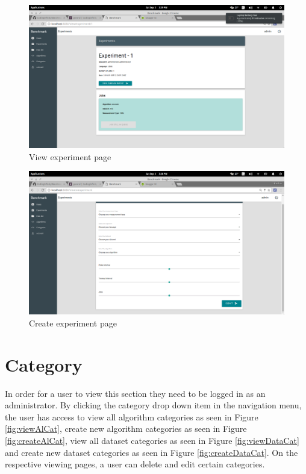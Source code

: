 \documentclass[11pt,a4paper]{article}
\begin{document}
\begin{figure}[H]
	\begin{center}
		\includegraphics[scale=0.3]{../Images/User Manual/View Experiment.png}
		\caption{View experiment page}
		\label{fig:viewExperiment}
	\end{center}  
\end{figure}

\begin{figure}[H]
	\begin{center}
		\includegraphics[scale=0.3]{../Images/User Manual/Create Experiment.png}
		\caption{Create experiment page}
		\label{fig:createExperiment}
	\end{center}  
\end{figure}

\section{Category}
In order for a user to view this section they need to be logged in as an administrator.
By clicking the category drop down item in the navigation menu, the user has access to
view all algorithm categories as seen in Figure \ref{fig:viewAlCat}, create new algorithm
categories as seen in Figure \ref{fig:createAlCat}, view all dataset categories as seen in
Figure \ref{fig:viewDataCat} and create new dataset categories as seen in Figure \ref{fig:createDataCat}.
On the respective viewing pages, a user can delete and edit certain categories.
\end{document}
